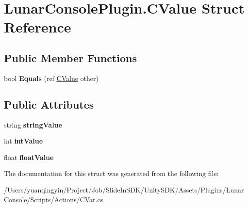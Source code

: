 \hypertarget{struct_lunar_console_plugin_1_1_c_value}{}\section{Lunar\+Console\+Plugin.\+C\+Value Struct Reference}
\label{struct_lunar_console_plugin_1_1_c_value}
\subsection*{Public Member Functions}
\begin{DoxyCompactItemize}
\item 
\mbox{\label{struct_lunar_console_plugin_1_1_c_value_a9b99065963053c52e8842d80d12d9dab}} 
bool {\bfseries Equals} (ref \mbox{\hyperlink{struct_lunar_console_plugin_1_1_c_value}{C\+Value}} other)
\end{DoxyCompactItemize}
\subsection*{Public Attributes}
\begin{DoxyCompactItemize}
\item 
\mbox{\label{struct_lunar_console_plugin_1_1_c_value_a483d76c5cbeadac94d9a6b7a130a236d}} 
string {\bfseries string\+Value}
\item 
\mbox{\label{struct_lunar_console_plugin_1_1_c_value_a25d1f32981c76843d3a8764cee608e46}} 
int {\bfseries int\+Value}
\item 
\mbox{\label{struct_lunar_console_plugin_1_1_c_value_a50f10dff5a511a5c5e46d1a547d31244}} 
float {\bfseries float\+Value}
\end{DoxyCompactItemize}


The documentation for this struct was generated from the following file\+:\begin{DoxyCompactItemize}
\item 
/\+Users/yuanqingyin/\+Project/\+Job/\+Slide\+In\+S\+D\+K/\+Unity\+S\+D\+K/\+Assets/\+Plugins/\+Lunar\+Console/\+Scripts/\+Actions/C\+Var.\+cs\end{DoxyCompactItemize}
